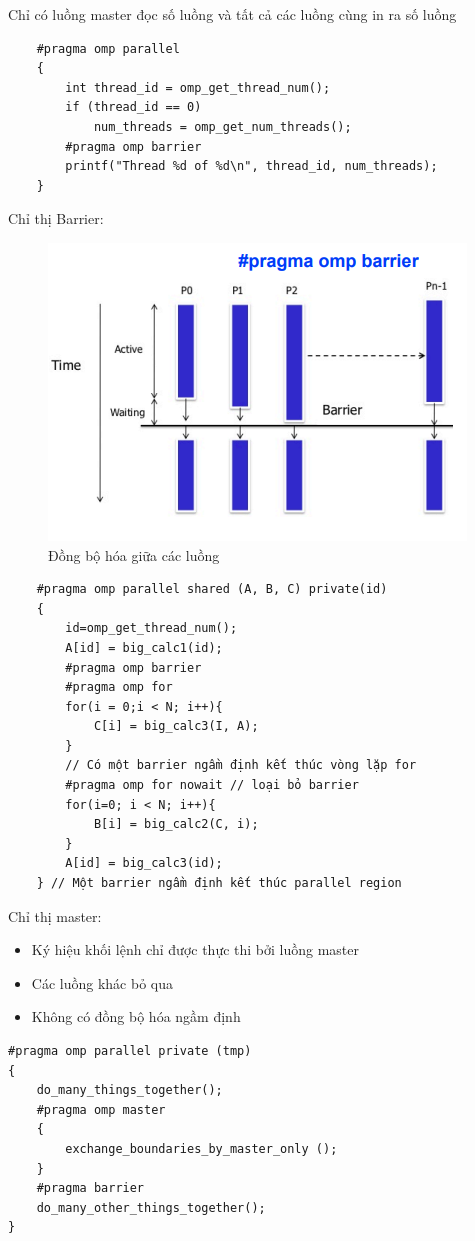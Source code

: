 \documentclass[14pt, a4paper]{article}
\numberwithin{equation}{section}
\numberwithin{figure}{section}
\numberwithin{dl}{section}
\numberwithin{md}{section}
\numberwithin{bd}{section}
\numberwithin{dn}{section}
\numberwithin{hq}{section}
\begin{document}
Chỉ có luồng master đọc số luồng và tất cả các luồng cùng in ra số luồng
        \begin{verbatim}
    #pragma omp parallel
    {
        int thread_id = omp_get_thread_num();
        if (thread_id == 0)
            num_threads = omp_get_num_threads();
        #pragma omp barrier
        printf("Thread %d of %d\n", thread_id, num_threads); 
    }
        \end{verbatim}

Chỉ thị Barrier:

\begin{figure}[H]
    \centering
    \includegraphics[width=0.9\linewidth]{figures/OpenMP/Barrier.png}
    \caption{Đồng bộ hóa giữa các luồng}
\end{figure}

\begin{verbatim}
    #pragma omp parallel shared (A, B, C) private(id)
    {
        id=omp_get_thread_num();
        A[id] = big_calc1(id);
        #pragma omp barrier
        #pragma omp for
        for(i = 0;i < N; i++){
            C[i] = big_calc3(I, A);
        }
        // Có một barrier ngầm định kết thúc vòng lặp for
        #pragma omp for nowait // loại bỏ barrier
        for(i=0; i < N; i++){ 
            B[i] = big_calc2(C, i); 
        }
        A[id] = big_calc3(id);
    } // Một barrier ngầm định kết thúc parallel region
\end{verbatim}

Chỉ thị master:

\begin{itemize}
        \item Ký hiệu khối lệnh chỉ được thực thi bởi luồng master
        \item Các luồng khác bỏ qua
        \item Không có đồng bộ hóa ngầm định
    \end{itemize}
    \begin{verbatim}
#pragma omp parallel private (tmp)
{
    do_many_things_together();
    #pragma omp master
    { 
        exchange_boundaries_by_master_only (); 
    }
    #pragma barrier
    do_many_other_things_together();
} 
    \end{verbatim}
\end{document}
